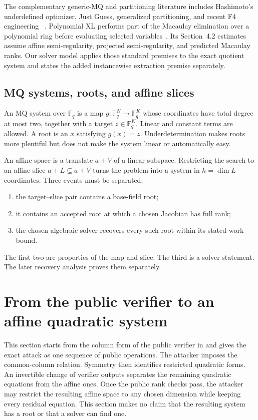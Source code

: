 \documentclass[11pt]{article}
\newcommand{\F}{\mathbb F}
\begin{document}
The complementary generic-MQ and partitioning literature includes
Hashimoto's underdefined optimizer, Just Guess, generalized partitioning, and
recent F4 engineering
~\cite{Hashimoto2023,MayOstuzziRessler2026,AsanumaEtAl2026,SakataTakagi2026}.
Polynomial XL performs part of the Macaulay elimination over a polynomial
ring before evaluating selected variables~\cite{FurueKudo2024PXL}.  Its
Section~4.2 estimates assume affine semi-regularity, projected
semi-regularity, and predicted Macaulay ranks.  Our solver model applies those
standard premises to the exact quotient system and states the added
instancewise extraction premise separately.

\subsection{MQ systems, roots, and affine slices}
An MQ system over $\F_q$ is a map $g:\F_q^N\to\F_q^K$ whose coordinates
have total degree at most two, together with a target $z\in\F_q^K$.  Linear
and constant terms are allowed.  A root is an $x$ satisfying $g(x)=z$.
Underdetermination makes roots more plentiful but does not make the system
linear or automatically easy.

An affine space is a translate $a+V$ of a linear subspace.  Restricting the
search to an affine slice $a+L\subseteq a+V$ turns the problem into a system
in $h=\dim L$ coordinates.  Three events must be separated:
\begin{enumerate}[label=(\roman*)]
\item the target--slice pair contains a base-field root;
\item it contains an accepted root at which a chosen Jacobian has full rank;
\item the chosen algebraic solver recovers every such root within its stated
      work bound.
\end{enumerate}
The first two are properties of the map and slice.  The third is a solver
statement.  The later recovery analysis proves them separately.

\section{From the public verifier to an affine quadratic system}
\label{sec:public-symmetry}\label{sec:affine-reduction}

This section starts from the column form of the public verifier in
 and gives the exact attack
as one sequence of public operations.  The attacker imposes the common-column
relation.  Symmetry then identifies restricted quadratic forms.  An invertible
change of verifier outputs separates the remaining quadratic equations from
the affine ones.  Once the public rank checks pass, the attacker may restrict
the resulting affine space to any chosen dimension while keeping every
residual equation.  This section makes no claim that the resulting system has
a root or that a solver can find one.
\end{document}
